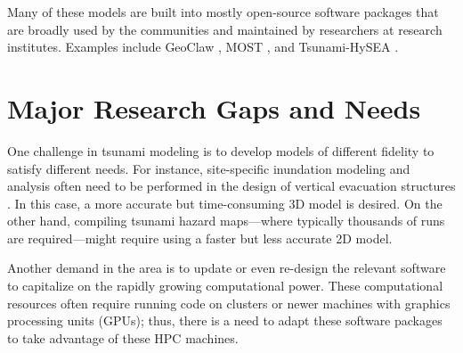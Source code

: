 Many of these models are built into mostly open-source software packages that are broadly used by the communities and maintained by researchers at research institutes. Examples include GeoClaw \citep{berger2011geoclaw}, MOST \citep{titov1997implementation}, and Tsunami-HySEA \citep{macias2016comparison}.

\section{Major Research Gaps and Needs}
\label{sec:tsunami_gaps}

One challenge in tsunami modeling is to develop models of different fidelity to satisfy different needs. For instance, site-specific inundation modeling and analysis often need to be performed in the design of vertical evacuation structures \citep{Ash, 2015, gonzalez2013tsunami}. In this case, a more accurate but time-consuming 3D model is desired. On the other hand, compiling tsunami hazard maps—where typically thousands of runs are required—might require using a faster but less accurate 2D model.

Another demand in the area is to update or even re-design the relevant software to capitalize on the rapidly growing computational power. These computational resources often require running code on clusters or newer machines with graphics processing units (GPUs); thus, there is a need to adapt these software packages to take advantage of these HPC machines.

%
